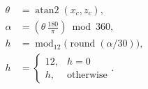 \begin{align*}
    \theta &= \operatorname{atan2}(x_{c}, z_{c}),\\
    \alpha &= \left(\theta\,\frac{180}{\pi}\right) \bmod 360,\\
    h &= \operatorname{mod}_{12}\bigl(\operatorname{round}(\alpha/30)\bigr),\\
    h &= \begin{cases}12,& h=0\\h,&\text{otherwise} \end{cases}.
\end{align*}
